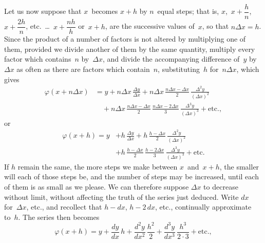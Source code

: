 \documentclass[12pt]{book}[2005/09/16]
\newcommand{\Chg}[2]{#2}
\newcommand{\Add}[1]{\Chg{}{#1}}
\newlength{\TmpLen}
\newcommand{\Pagelabel}[1]{\phantomsection\label{page:#1}}
\newcommand{\PageSep}[1]{\Pagelabel{#1}\ignorespaces}
\renewcommand{\etc}{\text{etc}}
\renewcommand{\(}{{\upshape(}}
\renewcommand{\)}{{\upshape)}}
\renewcommand{\phi}{\varphi}
\newcommand{\PadTo}[3][c]{%
  \settowidth{\TmpLen}{$#2$}%
  \makebox[\TmpLen][#1]{$#3$}%
}
\begin{document}
Let us now suppose that $x$~becomes $x + h$ by $n$~equal
steps; that is, $x$,~$x + \dfrac{h}{n}$, $x + \dfrac{2h}{n}$, etc.~\dots\ $x + \dfrac{nh}{h}$
or~$x + h$, are the successive values of~$x$, so that
$n\Delta x = h$. Since the product of a number of factors is
not altered by multiplying one of them, provided we
divide another of them by the same quantity, multiply
every factor which contains~$n$ by~$\Delta x$, and divide the
accompanying difference of~$y$ by $\Delta x$ as often as there
are factors which contain~$n$, substituting~$h$ for~$n\Delta x$,
which gives
\begin{align*}
\phi(x + n\Delta x)
  &= y + n\Delta x\, \frac{\Delta y}{\Delta x}
       + n\Delta x\, \frac{n\Delta x - \Delta x}{2}\, \frac{\Delta^{2} y}{(\Delta x)^{2}} \\
  &\quad+ n\Delta x\, \frac{n\Delta x -  \Delta x}{2}\,
                 \frac{n\Delta x - 2\Delta x}{3}\, \frac{\Delta^{3} y}{(\Delta x)^{3}} + \etc.\Add{,}
\end{align*}
or
\begin{align*}
\iffalse %
\phi(x + h)
  &= \PadTo{y + n\Delta x}{y + h}\, \frac{\Delta y}{\Delta x}
       + \PadTo{n\Delta x}{h}\,
         \PadTo{\dfrac{n\Delta x - \Delta x}{2}}{\dfrac{h - \Delta x}{2}}\,
         \frac{\Delta^{2} y}{(\Delta x)^{2}} \\
  &+ \PadTo{n\Delta x}{h}\,
     \PadTo{\dfrac{n\Delta x -  \Delta x}{2}}{\dfrac{h -  \Delta x}{2}}\,
     \PadTo{\dfrac{n\Delta x - 2\Delta x}{3}}{\dfrac{h - 2\Delta x}{3}}\,
     \frac{\Delta^{3} y}{(\Delta x)^{3}} + \etc.
\fi
\phi(x + h)
  = y &+ h\, \frac{\Delta y}{\Delta x}
       + h\, \frac{h - \Delta x}{2}\, \frac{\Delta^{2} y}{(\Delta x)^{2}} \\
  &+ h\, \frac{h -  \Delta x}{2}\, \frac{h - 2\Delta x}{3}\,
         \frac{\Delta^{3} y}{(\Delta x)^{3}} + \etc.
\end{align*}
If $h$ remain the same, the more steps we make between
$x$~and~$x + h$, the smaller will each of those
steps be, and the number of steps may be increased,
until each of them is as small as we please. We can
therefore suppose $\Delta x$ to decrease without limit, without
affecting the truth of the series just deduced.
Write $dx$ for~$\Delta x$, etc., and recollect that $h - dx$,
$h - 2\, dx$, etc., continually approximate to~$h$. The series
then becomes
\[
\phi(x + h) = y + \frac{dy}{dx}\, h
  + \frac{d^{2} y}{dx^{2}}\, \frac{h^{2}}{2}
  + \frac{d^{3} y}{dx^{3}}\, \frac{h^{3}}{2·3} + \etc.\Add{,}
\]
\PageSep{94}
\end{document}
